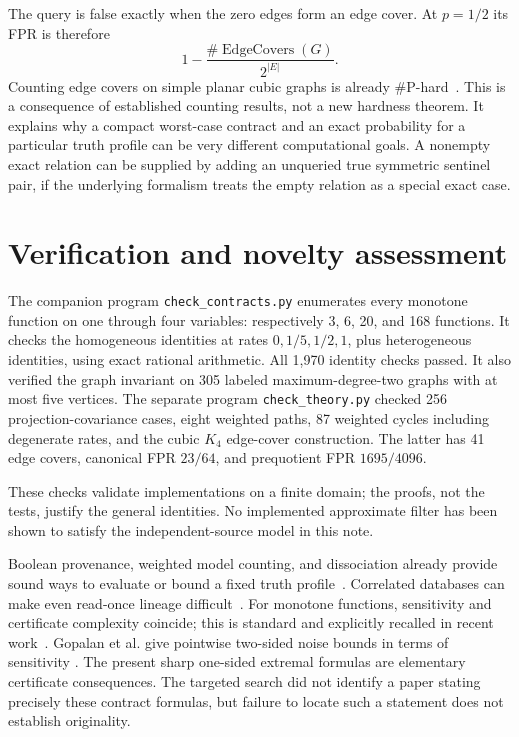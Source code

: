 \documentclass[11pt]{article}
\begin{document}
The query is false exactly when the zero edges form an edge cover. At
$p=1/2$ its FPR is therefore
\[
 1-\frac{\#\operatorname{EdgeCovers}(G)}{2^{|E|}}.
\]
Counting edge covers on simple planar cubic graphs is already
\#P-hard~\cite{amarilliMonet,caiLuXia}. This is a consequence of established
counting results, not a new hardness theorem. It explains why a compact
worst-case contract and an exact probability for a particular truth profile
can be very different computational goals. A nonempty exact relation can
be supplied by adding an unqueried true symmetric sentinel pair, if the
underlying formalism treats the empty relation as a special exact case.

\section{Verification and novelty assessment}

The companion program \texttt{check\_contracts.py} enumerates every monotone
function on one through four variables: respectively 3, 6, 20, and 168
functions. It checks the homogeneous identities at rates
$0,1/5,1/2,1$, plus heterogeneous identities, using exact rational arithmetic.
All 1,970 identity checks passed. It also verified the graph invariant on
305 labeled maximum-degree-two graphs with at most five vertices.
The separate program \texttt{check\_theory.py} checked 256 projection-covariance
cases, eight weighted paths, 87 weighted cycles including degenerate rates,
and the cubic $K_4$ edge-cover construction. The latter has 41 edge covers,
canonical FPR $23/64$, and prequotient FPR $1695/4096$.

These checks validate implementations on a finite domain; the proofs, not
the tests, justify the general identities. No implemented approximate filter
has been shown to satisfy the independent-source model in this note.

Boolean provenance, weighted model counting, and dissociation already provide
sound ways to evaluate or bound a fixed truth profile~\cite{gatterbauerSuciu}.
Correlated databases can make even read-once lineage difficult~\cite{kanagalDeshpande}.
For monotone functions, sensitivity and certificate complexity coincide;
this is standard and explicitly recalled in recent work~\cite{blanc}.
Gopalan et al. give pointwise two-sided noise bounds in terms of sensitivity
\cite[Lemma 15]{gopalan}. The present sharp one-sided extremal formulas are
elementary certificate consequences. The targeted search did not identify
a paper stating precisely these contract formulas, but failure to locate
such a statement does not establish originality.
\end{document}
